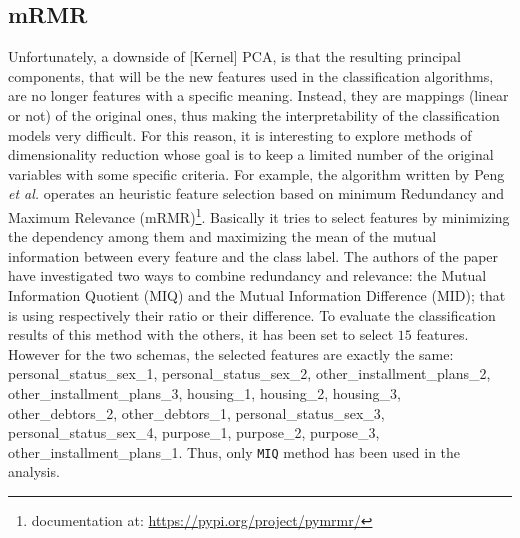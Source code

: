 \documentclass[letterpaper]{article}
\begin{document}
	\subsection{mRMR}
	\par Unfortunately, a downside of [Kernel] PCA, is that the resulting principal components, that will be the new features used in the classification algorithms, are no longer features with a specific meaning. Instead, they are mappings (linear or not) of the original ones, thus making the interpretability of the classification models very difficult. For this reason, it is interesting to explore methods of dimensionality reduction whose goal is to keep a limited number of the original variables with some specific criteria. For example, the algorithm written by Peng \emph{et al.}\cite{Peng05featureselection} operates an heuristic feature selection based on minimum Redundancy and Maximum Relevance (mRMR)\footnote{documentation at: \url{https://pypi.org/project/pymrmr/}}. Basically it tries to select features by minimizing the dependency among them and maximizing the mean of the mutual information between every feature and the class label. The authors of the paper have investigated two ways to combine redundancy and relevance: the Mutual Information Quotient (MIQ) and the Mutual Information Difference (MID); that is using respectively their ratio or their difference. To evaluate the classification results of this method with the others, it has been set to select $15$ features. However for the two schemas, the selected features are exactly the same: personal\_status\_sex\_1, personal\_status\_sex\_2, other\_installment\_plans\_2, other\_installment\_plans\_3, housing\_1, housing\_2, housing\_3, other\_debtors\_2, other\_debtors\_1, personal\_status\_sex\_3, personal\_status\_sex\_4, purpose\_1, purpose\_2, purpose\_3, other\_installment\_plans\_1. Thus, only \texttt{MIQ} method has been used in the analysis.
\end{document}
